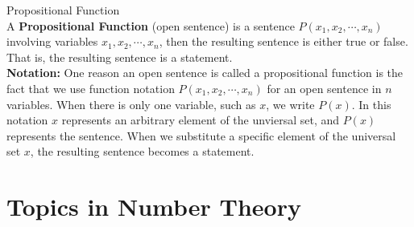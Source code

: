 \begin{definition}
Propositional Function \\

A {\bf Propositional Function} (open sentence) is a sentence $P(x_1, x_2, \cdots, x_n)$ involving variables $x_1, x_2, \cdots, x_n$, then the resulting sentence is either true or false. That is, the resulting sentence is a statement. \\
{\bf Notation:} One reason an open sentence is called a propositional function is the fact that we use function notation $P(x_1, x_2, \cdots, x_n)$ for an open sentence in $n$ variables. When there is only one variable, such as $x$, we write $P(x)$. In this notation $x$ represents an arbitrary element of the unviersal set, and $P(x)$ represents the sentence. When we substitute a specific element of the universal set $x$, the resulting sentence becomes a statement. \\
\end{definition}








\newpage
\section{Topics in Number Theory}
\newpage

